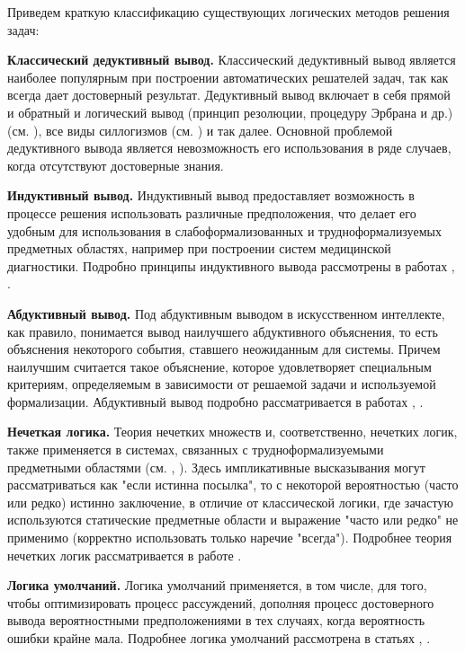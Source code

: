 Приведем краткую классификацию существующих логических методов решения задач:
\begin{textitemize}
	\item{\textbf{Классический дедуктивный вывод.} Классический дедуктивный вывод является наиболее популярным при построении автоматических решателей задач, так как всегда дает достоверный результат. Дедуктивный вывод включает в себя прямой и обратный и логический вывод (принцип резолюции, процедуру Эрбрана и др.) (см. \textit{}), все виды силлогизмов (см. \textit{}) и так далее. Основной проблемой дедуктивного вывода является невозможность его использования в ряде случаев, когда отсутствуют достоверные знания.}
	\item{\textbf{Индуктивный вывод.} Индуктивный вывод предоставляет возможность в процессе решения использовать различные предположения, что делает его удобным для использования в слабоформализованных и трудноформализуемых предметных областях, например при построении систем медицинской диагностики. Подробно принципы индуктивного вывода рассмотрены в работах \textit{}, \textit{}.}
	\item{\textbf{Абдуктивный вывод.} Под абдуктивным выводом в искусственном интеллекте, как правило, понимается вывод наилучшего абдуктивного объяснения, то есть объяснения некоторого события, ставшего неожиданным для системы. Причем наилучшим считается такое объяснение, которое удовлетворяет специальным критериям, определяемым в зависимости от решаемой задачи и используемой	формализации. Абдуктивный вывод подробно рассматривается в работах \textit{}, \textit{}.}
	\item{\textbf{Нечеткая логика.} Теория нечетких множеств и, соответственно, нечетких логик, также применяется в системах, связанных с трудноформализуемыми предметными областями (см. \textit{}, \textit{}). Здесь импликативные высказывания могут рассматриваться как "если истинна посылка"{}, то с некоторой вероятностью (часто или редко) истинно заключение, в отличие от классической логики, где зачастую используются статические предметные области и выражение "часто или редко"{} не применимо (корректно использовать только наречие "всегда"{}). Подробнее теория нечетких логик рассматривается в работе \textit{}.}
	\item{\textbf{Логика умолчаний.} Логика умолчаний применяется, в том числе, для того, чтобы оптимизировать процесс рассуждений,	дополняя процесс достоверного вывода вероятностными  предположениями в тех случаях, когда вероятность ошибки крайне мала. Подробнее логика умолчаний рассмотрена в статьях \textit{}, \textit{}.}

\end{textitemize}

